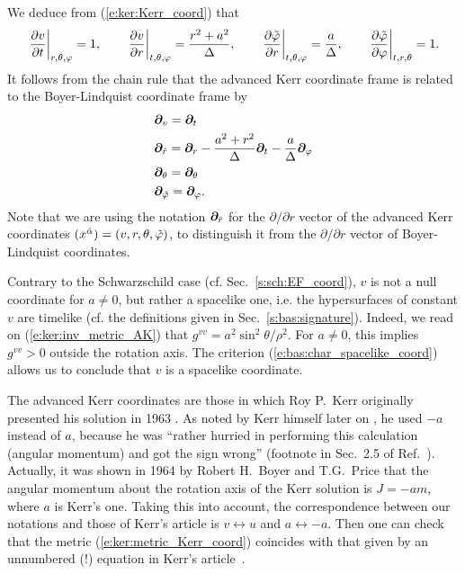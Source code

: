 We deduce from (\ref{e:ker:Kerr_coord}) that
\[
    \left. \frac{\partial v}{\partial t} \right| _{r,\theta,\varphi} = 1, \qquad
    \left. \frac{\partial v}{\partial r} \right| _{t,\theta,\varphi} = \frac{r^2 + a^2}{\Delta},\qquad
    \left. \frac{\partial {\tilde\varphi}}{\partial r} \right| _{t,\theta,\varphi} = \frac{a}{\Delta},\qquad
    \left. \frac{\partial {\tilde\varphi}}{\partial \varphi} \right| _{t,r,\theta} = 1.
\]
It follows from the chain rule that
the advanced Kerr coordinate frame
is related to the Boyer-Lindquist coordinate frame by
\begin{subequations}
\label{e:ker:frame_Kerr_BL}
\begin{align}
    & \bm{\partial}_v = \bm{\partial}_t \\
    & \bm{\partial}_{\hat{r}} = \bm{\partial}_r - \frac{a^2+r^2}{\Delta} \bm{\partial}_t
                        - \frac{a}{\Delta} \bm{\partial}_\varphi \label{e:ker:frame_Kerr_BL_r}\\
    & \bm{\partial}_\theta = \bm{\partial}_\theta \\
    & \bm{\partial}_{{\tilde\varphi}} = \bm{\partial}_\varphi .
\end{align}
\end{subequations}
Note that we are using the notation $\bm{\partial}_{\hat{r}}$ for the $\partial/\partial r$
vector of the advanced Kerr coordinates $(x^{\hat{\alpha}}) = (v,r,\theta,{\tilde\varphi})$, to distinguish
it from the $\partial/\partial r$ vector of Boyer-Lindquist coordinates.

\begin{remark}
Contrary to the Schwarzschild case (cf. Sec.~\ref{s:sch:EF_coord}), $v$ is not a null coordinate
for $a\neq 0$, but rather a spacelike one, i.e. the hypersurfaces of constant $v$
are timelike (cf. the definitions given in Sec.~\ref{s:bas:signature}). Indeed,
we read on (\ref{e:ker:inv_metric_AK}) that
$g^{vv} = a^2 \sin^2\theta /\rho^2$. For $a\neq 0$, this implies
$g^{vv} > 0$ outside the rotation
axis. The criterion (\ref{e:bas:char_spacelike_coord}) allows us to conclude
that $v$ is a spacelike coordinate.
\end{remark}

\begin{hist} \label{h:ker:Kerr_coord}
The advanced Kerr coordinates are those in which Roy P.~Kerr originally presented his
solution in 1963 \cite{Kerr63}. As noted by Kerr himself later on \cite{Kerr09}, he used $-a$ instead of $a$,
because he was ``rather hurried in performing
this calculation (angular momentum) and got the sign wrong'' (footnote in Sec.~2.5 of
Ref.~\cite{Kerr09}).
Actually, it was shown in 1964
by Robert H.~Boyer and
T.G.~Price \cite{BoyerP65}
that the angular momentum about the rotation axis of the Kerr solution is $J=- a m$,
where $a$ is Kerr's one.
Taking this into account, the correspondence between our notations and those of Kerr's article \cite{Kerr63}
is $v\leftrightarrow u$ and $a\leftrightarrow -a$. Then one can check that
the metric (\ref{e:ker:metric_Kerr_coord}) coincides with that given
by an unnumbered (!) equation in Kerr's article~\cite{Kerr63}.
\end{hist}

